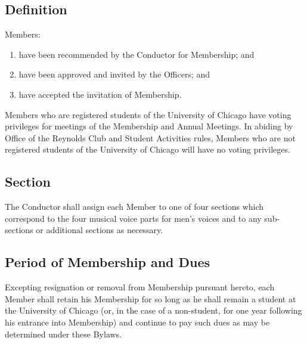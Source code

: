 \documentclass{article}
\begin{document}
\subsection{Definition}

Members:
\begin{enumerate}
\item have been recommended by the Conductor for Membership; and
\item have been approved and invited by the Officers; and
\item have accepted the invitation of Membership.
\end{enumerate}
Members who are registered students of the University of Chicago have
voting privileges for meetings of the Membership and Annual Meetings.
In abiding by Office of the Reynolds Club and Student Activities rules,
Members who are not registered students of the University of Chicago
will have no voting privileges.

\subsection{Section}

The Conductor shall assign each Member to one of four sections which
correspond to the four musical voice parts for men's voices and to
any sub-sections or additional sections as necessary.

\subsection{Period of Membership and Dues}

Excepting resignation or removal from Membership pursuant hereto,
each Member shall retain his Membership for so long as he shall remain
a student at the University of Chicago (or, in the case of a non-student,
for one year following his entrance into Membership) and continue
to pay such dues as may be determined under these Bylaws.

\end{document}
